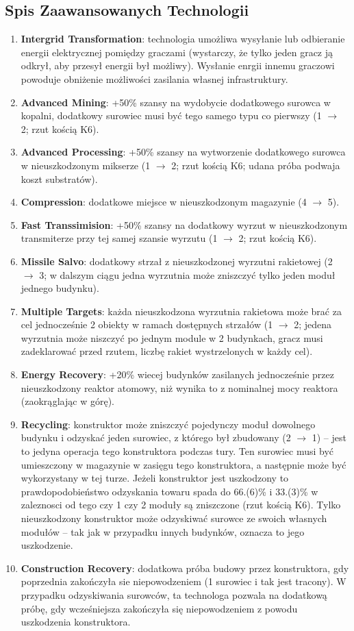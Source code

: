 \documentclass[11pt,a4paper]{article}
\begin{document}
\subsection{Spis Zaawansowanych Technologii}
\begin{enumerate}
\item \textbf{Intergrid Transformation}: technologia umożliwa wysyłanie lub odbieranie energii elektrycznej pomiędzy graczami (wystarczy, że tylko jeden gracz ją odkrył, aby przesył energii był możliwy). Wysłanie enrgii innemu graczowi powoduje obniżenie możliwości zasilania własnej infrastruktury.
\item \textbf{Advanced Mining}: +50\% szansy na wydobycie dodatkowego surowca w kopalni, dodatkowy surowiec musi być tego samego typu co pierwszy (1 $\to$ 2; rzut kością K6).
\item \textbf{Advanced Processing}: +50\% szansy na wytworzenie dodatkowego surowca w nieuszkodzonym mikserze (1 $\to$ 2; rzut kością K6; udana próba podwaja koszt substratów).
\item \textbf{Compression}: dodatkowe miejsce w nieuszkodzonym magazynie (4 $\to$ 5).
\item \textbf{Fast Transsimision}: +50\% szansy na dodatkowy wyrzut w nieuszkodzonym transmiterze przy tej samej szansie wyrzutu (1 $\to$ 2; rzut kością K6).
\item \textbf{Missile Salvo}: dodatkowy strzał z nieuszkodzonej wyrzutni rakietowej (2 $\to$ 3; w dalszym ciągu jedna wyrzutnia może zniszczyć tylko jeden moduł jednego budynku).
\item \textbf{Multiple Targets}: każda nieuszkodzona wyrzutnia rakietowa może brać za cel jednocześnie 2 obiekty w ramach dostępnych strzałów (1 $\to$ 2; jedena wyrzutnia może niszczyć po jednym module w 2 budynkach, gracz musi zadeklarować przed rzutem, liczbę rakiet wystrzelonych w każdy cel).
\item \textbf{Energy Recovery}: +20\% wiecej budynków zasilanych jednocześnie przez nieuszkodzony reaktor atomowy, niż wynika to z nominalnej mocy reaktora (zaokrąglając w górę).
\item \textbf{Recycling}: konstruktor może zniszczyć pojedynczy moduł dowolnego budynku i odzyskać jeden surowiec, z którego był zbudowany (2 $\to$ 1) -- jest to jedyna operacja tego konstruktora podczas tury. Ten surowiec musi być umieszczony w magazynie w zasięgu tego konstruktora, a następnie może być wykorzystany w tej turze. Jeżeli konstruktor jest uszkodzony to prawdopodobieństwo odzyskania towaru spada do 66.(6)\% i 33.(3)\% w zaleznosci od tego czy 1 czy 2 moduły są zniszczone (rzut kością K6). Tylko nieuszkodzony konstruktor może odzyskiwać surowce ze swoich własnych modułów -- tak jak w przypadku innych budynków, oznacza to jego uszkodzenie.
\item \textbf{Construction Recovery}: dodatkowa próba budowy przez konstruktora, gdy poprzednia zakończyła sie niepowodzeniem (1 surowiec i tak jest tracony). W przypadku odzyskiwania surowców, ta technologa pozwala na dodatkową próbę, gdy wcześniejsza zakończyła się niepowodzeniem z powodu uszkodzenia konstruktora. 
\end{enumerate}
\end{document}
